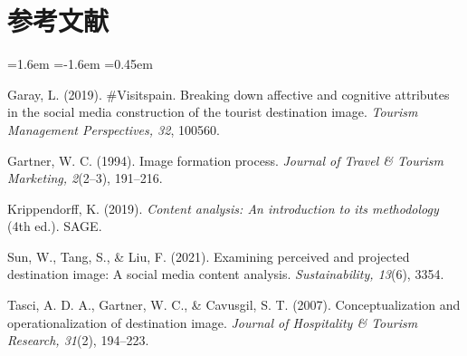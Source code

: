 \documentclass[11pt]{article}
\begin{document}
\section*{参考文献}
{\raggedright
\begin{list}{}{\leftmargin=1.6em \itemindent=-1.6em \itemsep=0.45em \parsep=0pt}
\item Garay, L. (2019). \#Visitspain. Breaking down affective and cognitive attributes in the social media construction of the tourist destination image. {\enit\itshape Tourism Management Perspectives, 32}, 100560.
\item Gartner, W. C. (1994). Image formation process. {\enit\itshape Journal of Travel \& Tourism Marketing, 2}(2--3), 191--216.
\item Krippendorff, K. (2019). {\enit\itshape Content analysis: An introduction to its methodology} (4th ed.). SAGE.
\item Sun, W., Tang, S., \& Liu, F. (2021). Examining perceived and projected destination image: A social media content analysis. {\enit\itshape Sustainability, 13}(6), 3354.
\item Tasci, A. D. A., Gartner, W. C., \& Cavusgil, S. T. (2007). Conceptualization and operationalization of destination image. {\enit\itshape Journal of Hospitality \& Tourism Research, 31}(2), 194--223.
\end{list}
}
\end{document}
